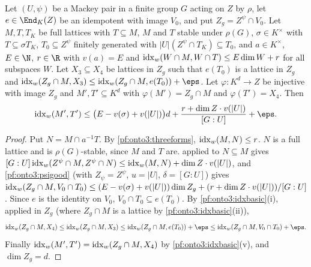 \begin{proposition}\label{pf:onto3:onlocal}
Let $(U,\psi)$ be a Mackey pair in a finite group $G$ acting on $Z$ by $\rho$, let $e\in\End_K(Z)$ be an idempotent
with image $V_0$, and put $Z_g=Z^\psi\cap V_0$. Let $M,T,T_K$ be full lattices with $T\subseteq M$, $M$ and $T$ stable
under $\rho(G)$, $\sigma\in K^\times$ with $T\subseteq\sigma T_K$, $T_0\subseteq Z^\psi$ finitely generated with
$|U|(Z^\psi\cap T_K)\subseteq T_0$, and $a\in K^\times$, $E\in\N$, $r\in\R$ with $v(a)=E$ and
$\operatorname{idx}_w(W\cap M,W\cap T)\le E\dim W+r$ for all subspaces $W$. Let $X_3\subseteq X_4$ be lattices in
$Z_g$ such that $e(T_0)$ is a lattice in $Z_g$ and $\ontothreeidx_w(Z_g\cap M,X_3)\le\ontothreeidx_w(Z_g\cap
M,e(T_0))+\eps$. Let $\varphi\colon K^d\to Z$ be injective with image $Z_g$ and $M',T'\subseteq K^d$ with
$\varphi(M')=Z_g\cap M$ and $\varphi(T')=X_4$. Then
\[
\ontothreeidx_w(M',T')\le\bigl(E-v(\sigma)+v(|U|)\bigr)d+\frac{r+\dim Z\cdot v(|U|)}{[G:U]}+\eps.
\]
\end{proposition}

\begin{proof}
Put $N=M\cap a^{-1}T$. By \cref{pf:onto3:threeforms}, $\operatorname{idx}_w(M,N)\le r$. $N$ is a full lattice and is
$\rho(G)$-stable, since $M$ and $T$ are.  applied to $N\subseteq M$ gives
$[G:U]\operatorname{idx}_w(Z^\psi\cap M,Z^\psi\cap N)\le\operatorname{idx}_w(M,N)+\dim Z\cdot v(|U|)$, and
\cref{pf:onto3:psigood} (with $Z_\psi=Z^\psi$, $u=|U|$, $\delta=[G:U]$) gives
$\operatorname{idx}_w(Z_g\cap M,V_0\cap T_0)\le(E-v(\sigma)+v(|U|))\dim Z_g+(r+\dim Z\cdot v(|U|))/[G:U]$. Since $e$ is
the identity on $V_0$, $V_0\cap T_0\subseteq e(T_0)$. By \cref{pf:onto3:idxbasic}(i), applied in $Z_g$ (where
$Z_g\cap M$ is a lattice by \cref{pf:onto3:idxbasic}(ii)),
\[
\ontothreeidx_w(Z_g\cap M,X_4)\le\ontothreeidx_w(Z_g\cap M,X_3)\le\ontothreeidx_w(Z_g\cap M,e(T_0))+\eps
\le\ontothreeidx_w(Z_g\cap M,V_0\cap T_0)+\eps .
\]
Finally $\operatorname{idx}_w(M',T')=\operatorname{idx}_w(Z_g\cap M,X_4)$ by \cref{pf:onto3:idxbasic}(v), and $\dim Z_g=d$.
\end{proof}

